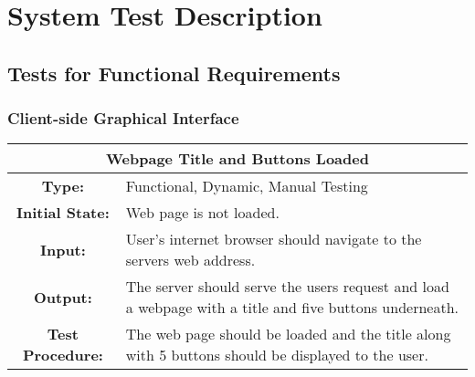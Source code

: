 \documentclass[12pt, titlepage]{article}
\begin{document}
\section{System Test Description}

\subsection{Tests for Functional Requirements}

\subsubsection{Client-side Graphical Interface}

\begin{center}
\begin{table}[H]
\begin{tabularx}{\textwidth}{| c X |}
\hline
\multicolumn{2}{|c|}{\textbf{Webpage Title and Buttons Loaded}}\\
\hline
\textbf{Type: } & Functional, Dynamic, Manual Testing\\

\textbf{Initial State: } & Web page is not loaded.\\

\textbf{Input: } & User's internet browser should navigate to the servers web address.\\

\textbf{Output: } & The server should serve the users request and load a webpage with a title and five buttons underneath.\\

\textbf{Test Procedure:  } &   The web page should be loaded and the title along with 5 buttons should be displayed to the user.\\
\hline
\end{tabularx}
\end{table}
\end{center}
\end{document}

